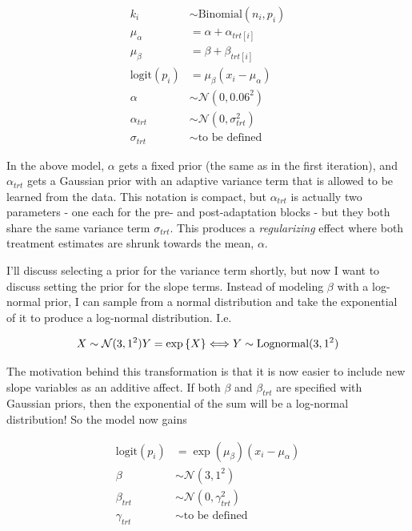\documentclass[11pt, oneside, openany]{scrbook}
\begin{document}

\begin{align*}
k_i &\sim \mathrm{Binomial}(n_i, p_i) \\
\mu_\alpha &= \alpha + \alpha_{trt[i]} \\
\mu_\beta &= \beta + \beta_{trt[i]} \\
\mathrm{logit}(p_i) &= \mu_\beta (x_i - \mu_\alpha) \\
\alpha &\sim \mathcal{N}(0, 0.06^2) \\
\alpha_{trt} &\sim \mathcal{N}(0, \sigma_{trt}^2) \\
\sigma_{trt} &\sim \textrm{to be defined}
\end{align*}

In the above model, \(\alpha\) gets a fixed prior (the same as in the first iteration), and \(\alpha_{trt}\) gets a Gaussian prior with an adaptive variance term that is allowed to be learned from the data. This notation is compact, but \(\alpha_{trt}\) is actually two parameters - one each for the pre- and post-adaptation blocks - but they both share the same variance term \(\sigma_{trt}\). This produces a \emph{regularizing} effect where both treatment estimates are shrunk towards the mean, \(\alpha\).

I'll discuss selecting a prior for the variance term shortly, but now I want to discuss setting the prior for the slope terms. Instead of modeling \(\beta\) with a log-normal prior, I can sample from a normal distribution and take the exponential of it to produce a log-normal distribution. I.e.


\[
X \sim \mathcal{N}(3, 1^2) \\
Y = \exp\left\lbrace X \right\rbrace \Longleftrightarrow Y \sim \mathrm{Lognormal(3, 1^2)}
\]

The motivation behind this transformation is that it is now easier to include new slope variables as an additive affect. If both \(\beta\) and \(\beta_{trt}\) are specified with Gaussian priors, then the exponential of the sum will be a log-normal distribution! So the model now gains


\begin{align*}
\mathrm{logit}(p_i) &= \exp(\mu_\beta) (x_i - \mu_\alpha) \\
\beta &\sim \mathcal{N}(3, 1^2) \\
\beta_{trt} &\sim \mathcal{N}(0, \gamma_{trt}^2) \\
\gamma_{trt} &\sim \textrm{to be defined}
\end{align*}
\end{document}
